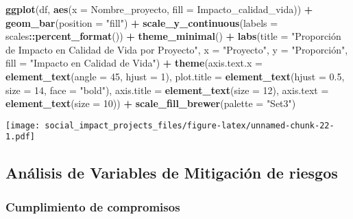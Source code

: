 \documentclass[
]{article}
\newenvironment{Shaded}{\begin{snugshade}}{\end{snugshade}}
\newcommand{\AttributeTok}[1]{\textcolor[rgb]{0.13,0.29,0.53}{#1}}
\newcommand{\DecValTok}[1]{\textcolor[rgb]{0.00,0.00,0.81}{#1}}
\newcommand{\FloatTok}[1]{\textcolor[rgb]{0.00,0.00,0.81}{#1}}
\newcommand{\FunctionTok}[1]{\textcolor[rgb]{0.13,0.29,0.53}{\textbf{#1}}}
\newcommand{\NormalTok}[1]{#1}
\newcommand{\SpecialCharTok}[1]{\textcolor[rgb]{0.81,0.36,0.00}{\textbf{#1}}}
\newcommand{\StringTok}[1]{\textcolor[rgb]{0.31,0.60,0.02}{#1}}
\begin{document}
\begin{Shaded}
\begin{Highlighting}[]
\FunctionTok{ggplot}\NormalTok{(df, }\FunctionTok{aes}\NormalTok{(}\AttributeTok{x =}\NormalTok{ Nombre\_proyecto, }\AttributeTok{fill =}\NormalTok{ Impacto\_calidad\_vida)) }\SpecialCharTok{+}
  \FunctionTok{geom\_bar}\NormalTok{(}\AttributeTok{position =} \StringTok{"fill"}\NormalTok{) }\SpecialCharTok{+}
  \FunctionTok{scale\_y\_continuous}\NormalTok{(}\AttributeTok{labels =}\NormalTok{ scales}\SpecialCharTok{::}\FunctionTok{percent\_format}\NormalTok{()) }\SpecialCharTok{+}
  \FunctionTok{theme\_minimal}\NormalTok{() }\SpecialCharTok{+}
  \FunctionTok{labs}\NormalTok{(}\AttributeTok{title =} \StringTok{"Proporción de Impacto en Calidad de Vida por Proyecto"}\NormalTok{, }
       \AttributeTok{x =} \StringTok{"Proyecto"}\NormalTok{, }\AttributeTok{y =} \StringTok{"Proporción"}\NormalTok{, }\AttributeTok{fill =} \StringTok{"Impacto en Calidad de Vida"}\NormalTok{) }\SpecialCharTok{+}
  \FunctionTok{theme}\NormalTok{(}\AttributeTok{axis.text.x =} \FunctionTok{element\_text}\NormalTok{(}\AttributeTok{angle =} \DecValTok{45}\NormalTok{, }\AttributeTok{hjust =} \DecValTok{1}\NormalTok{), }
        \AttributeTok{plot.title =} \FunctionTok{element\_text}\NormalTok{(}\AttributeTok{hjust =} \FloatTok{0.5}\NormalTok{, }\AttributeTok{size =} \DecValTok{14}\NormalTok{, }\AttributeTok{face =} \StringTok{"bold"}\NormalTok{),}
        \AttributeTok{axis.title =} \FunctionTok{element\_text}\NormalTok{(}\AttributeTok{size =} \DecValTok{12}\NormalTok{),}
        \AttributeTok{axis.text =} \FunctionTok{element\_text}\NormalTok{(}\AttributeTok{size =} \DecValTok{10}\NormalTok{)) }\SpecialCharTok{+}
  \FunctionTok{scale\_fill\_brewer}\NormalTok{(}\AttributeTok{palette =} \StringTok{"Set3"}\NormalTok{)}
\end{Highlighting}
\end{Shaded}

\texttt{[image: social\_impact\_projects\_files/figure-latex/unnamed-chunk-22-1.pdf]}

\subsection{\texorpdfstring{\textbf{Análisis de Variables de Mitigación
de
riesgos}}{Análisis de Variables de Mitigación de riesgos}}\label{anuxe1lisis-de-variables-de-mitigaciuxf3n-de-riesgos}

\subsubsection{\texorpdfstring{\textbf{Cumplimiento de
compromisos}}{Cumplimiento de compromisos}}\label{cumplimiento-de-compromisos}
\end{document}
